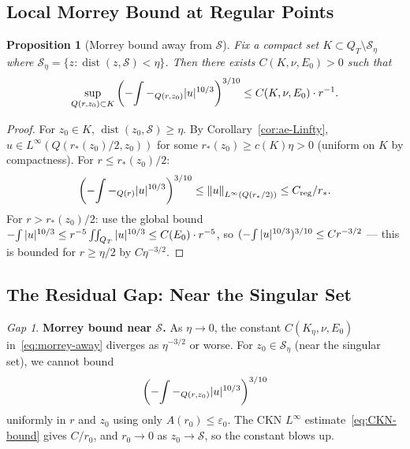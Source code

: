 \documentclass[11pt]{article}
\newtheorem{proposition}[theorem]{Proposition}
\theoremstyle{definition}
\theoremstyle{remark}
\newtheorem{gap}[theorem]{\color{red}Gap}
\newcommand{\norm}[1]{\left\|#1\right\|}
\newcommand{\Xint}{\mathop{\mathchoice{\vcenter{\hbox{$\displaystyle-$}}}%
  {\vcenter{\hbox{$\textstyle-$}}}%
  {\vcenter{\hbox{$\scriptstyle-$}}}%
  {\vcenter{\hbox{$\scriptscriptstyle-$}}}}\!\int}
\begin{document}
\subsection{Local Morrey Bound at Regular Points}

\begin{proposition}[Morrey bound away from $\mathcal{S}$]\label{prop:morrey-regular}
  Fix a compact set $K\subset Q_T\setminus\mathcal{S}_\eta$ where
  $\mathcal{S}_\eta = \{z: \operatorname{dist}(z,\mathcal{S})<\eta\}$.
  Then there exists $C(K,\nu,E_0)>0$ such that
  \begin{equation}\label{eq:morrey-away}
    \sup_{Q(r,z_0)\subset K}
    \left(\Xint-_{Q(r,z_0)}|u|^{10/3}\right)^{3/10}
    \leq C(K,\nu,E_0)\cdot r^{-1}.
  \end{equation}
\end{proposition}

\begin{proof}
  For $z_0\in K$, $\operatorname{dist}(z_0,\mathcal{S})\geq\eta$.
  By Corollary~\ref{cor:ae-Linfty}, $u\in L^\infty(Q(r_*(z_0)/2,z_0))$
  for some $r_*(z_0)\geq c(K)\eta>0$ (uniform on $K$ by compactness).
  For $r\leq r_*(z_0)/2$:
  \[
    \left(\Xint-_{Q(r)}|u|^{10/3}\right)^{3/10}
    \leq \norm{u}_{L^\infty(Q(r_*/2))}\leq C_{\mathrm{reg}}/r_*.
  \]
  For $r>r_*(z_0)/2$: use the global bound
  $\Xint|u|^{10/3}\leq r^{-5}\iint_{Q_T}|u|^{10/3}\leq C(E_0)\cdot r^{-5}$,
  so $(\Xint|u|^{10/3})^{3/10}\leq C r^{-3/2}$ — this is bounded for
  $r\geq\eta/2$ by $C\eta^{-3/2}$.
\end{proof}

\subsection{The Residual Gap: Near the Singular Set}

\begin{gap}\label{gap:near-singular}
  \textbf{Morrey bound near $\mathcal{S}$.}
  As $\eta\to 0$, the constant $C(K_\eta,\nu,E_0)$ in~\eqref{eq:morrey-away}
  diverges as $\eta^{-3/2}$ or worse.
  For $z_0\in\mathcal{S}_\eta$ (near the singular set), we cannot bound
  \[
    \left(\Xint-_{Q(r,z_0)}|u|^{10/3}\right)^{3/10}
  \]
  uniformly in $r$ and $z_0$ using only $A(r_0)\leq\varepsilon_0$.
  The CKN $L^\infty$ estimate~\eqref{eq:CKN-bound} gives $C/r_0$, and
  $r_0\to 0$ as $z_0\to\mathcal{S}$, so the constant blows up.
\end{gap}
\end{document}
